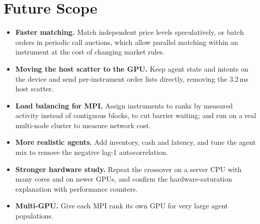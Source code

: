 \section{Future Scope}\label{sec:future}
\begin{itemize}
\item \textbf{Faster matching.} Match independent price levels speculatively, or batch orders in
  periodic call auctions, which allow parallel matching within an instrument at the cost of
  changing market rules.
\item \textbf{Moving the host scatter to the GPU.} Keep agent state and intents on the device and
  send per-instrument order lists directly, removing the 3.2\,ms host scatter.
\item \textbf{Load balancing for MPI.} Assign instruments to ranks by measured activity instead of
  contiguous blocks, to cut barrier waiting; and run on a real multi-node cluster to measure network
  cost.
\item \textbf{More realistic agents.} Add inventory, cash and latency, and tune the agent mix to
  remove the negative lag-1 autocorrelation.
\item \textbf{Stronger hardware study.} Repeat the crossover on a server CPU with many cores and on
  newer GPUs, and confirm the hardware-saturation explanation with performance counters.
\item \textbf{Multi-GPU.} Give each MPI rank its own GPU for very large agent populations.
\end{itemize}
